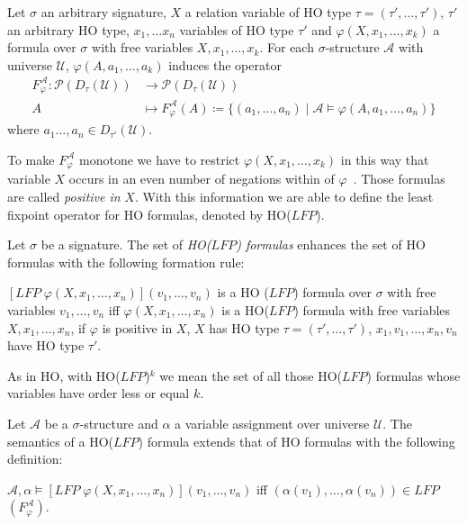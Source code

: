 \begin{definition}
\label{definition:induced_operator}
    Let $\sigma$ an arbitrary signature, $X$ a relation variable of HO type $\tau = (\tau', \dots, \tau')$,
    $\tau'$ an arbitrary HO type, $x_1, \dots x_n$ variables of HO type $\tau'$ and $\varphi(X, x_1, \dots, x_k)$ a
    formula over $\sigma$ with free variables $X, x_1, \dots, x_k$. For each $\sigma$-structure $\mathcal{A}$ with
    universe $\mathcal{U}$, $\varphi(A, a_1, \dots, a_k)$ induces the operator
    \begin{align*}
        F_\varphi^\mathcal{A}\colon\mathscr{P}(D_\tau(\mathcal{U})) &\longrightarrow \mathscr{P}(D_\tau(\mathcal{U}))\\
        A &\longmapsto F_\varphi^\mathcal{A}(A) \coloneqq \{(a_1, \dots, a_n) \mid \mathcal{A} \models \varphi(A, a_1,
        \dots, a_n)\}
    \end{align*}
    where $a_1 \dots, a_n \in D_{\tau'}(\mathcal{U})$.
\end{definition}

To make $F_\varphi^\mathcal{A}$ monotone we have to restrict $\varphi(X, x_1, \dots, x_k)$ in this way that variable
$X$ occurs in an even number of negations within of $\varphi$~\cite{freireMartins2011descriptive}. Those formulas
are called \textit{positive in} $X$. With this information we are able to define the least fixpoint operator for HO
formulas, denoted by HO($\mathit{LFP}$).

\begin{definition}
    Let $\sigma$ be a signature. The set of \emph{HO($\mathit{LFP}$) formulas} enhances the set of HO formulas with the
    following formation rule:
    \begin{compactitem}
        \item $[\mathit{LFP}\;\varphi(X, x_1, \dots, x_n)](v_1, \dots, v_n)$ is a HO
        ($\mathit{LFP}$) formula over $\sigma$ with free variables $v_1, \dots, v_n$ iff $\varphi(X, x_1, \dots, x_n)
        $ is a HO($\mathit{LFP}$) formula with free variables $X, x_1, \dots, x_n$, if $\varphi$ is positive in
        $X$, $X$ has HO type $\tau = (\tau', \dots, \tau')$, $x_1, v_1, \dots, x_n, v_n$ have HO type $\tau'$.
    \end{compactitem}
\end{definition}

As in HO, with HO($\mathit{LFP}$)$^k$ we mean the set of all those HO($\mathit{LFP}$) formulas whose variables have
order less or equal $k$.

\begin{definition}
    Let $\mathcal{A}$ be a $\sigma$-structure and $\alpha$ a variable assignment over universe $\mathcal{U}$. The
    semantics of a HO($\mathit{LFP}$) formula extends that of HO formulas with the following definition:
    \begin{compactitem}
        \item $\mathcal{A}, \alpha \models [\mathit{LFP}\;\varphi(X, x_1, \dots, x_n)](v_1, \dots,
        v_n)$ iff $(\alpha(v_1), \dots, \alpha(v_n)) \in \mathit{LFP}$ $(F_\varphi^\mathcal{A})$.
    \end{compactitem}
\end{definition}

